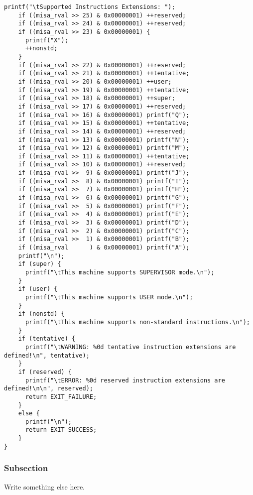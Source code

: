 \begin{lstlisting}[caption={A sample C++ code}, label=lst:sample_code]
    printf("\tSupported Instructions Extensions: ");
    if ((misa_rval >> 25) & 0x00000001) ++reserved;
    if ((misa_rval >> 24) & 0x00000001) ++reserved;
    if ((misa_rval >> 23) & 0x00000001) {
      printf("X");
      ++nonstd;
    }
    if ((misa_rval >> 22) & 0x00000001) ++reserved;
    if ((misa_rval >> 21) & 0x00000001) ++tentative;
    if ((misa_rval >> 20) & 0x00000001) ++user;
    if ((misa_rval >> 19) & 0x00000001) ++tentative;
    if ((misa_rval >> 18) & 0x00000001) ++super;
    if ((misa_rval >> 17) & 0x00000001) ++reserved;
    if ((misa_rval >> 16) & 0x00000001) printf("Q");
    if ((misa_rval >> 15) & 0x00000001) ++tentative;
    if ((misa_rval >> 14) & 0x00000001) ++reserved;
    if ((misa_rval >> 13) & 0x00000001) printf("N");
    if ((misa_rval >> 12) & 0x00000001) printf("M");
    if ((misa_rval >> 11) & 0x00000001) ++tentative;
    if ((misa_rval >> 10) & 0x00000001) ++reserved;
    if ((misa_rval >>  9) & 0x00000001) printf("J");
    if ((misa_rval >>  8) & 0x00000001) printf("I");
    if ((misa_rval >>  7) & 0x00000001) printf("H");
    if ((misa_rval >>  6) & 0x00000001) printf("G");
    if ((misa_rval >>  5) & 0x00000001) printf("F");
    if ((misa_rval >>  4) & 0x00000001) printf("E");
    if ((misa_rval >>  3) & 0x00000001) printf("D");
    if ((misa_rval >>  2) & 0x00000001) printf("C");
    if ((misa_rval >>  1) & 0x00000001) printf("B");
    if ((misa_rval      ) & 0x00000001) printf("A");
    printf("\n");
    if (super) {
      printf("\tThis machine supports SUPERVISOR mode.\n");
    }
    if (user) {
      printf("\tThis machine supports USER mode.\n");
    }
    if (nonstd) {
      printf("\tThis machine supports non-standard instructions.\n");
    }
    if (tentative) {
      printf("\tWARNING: %0d tentative instruction extensions are defined!\n", tentative);
    }
    if (reserved) {
      printf("\tERROR: %0d reserved instruction extensions are defined!\n\n", reserved);
      return EXIT_FAILURE;
    }
    else {
      printf("\n");
      return EXIT_SUCCESS;
    }
}

\end{lstlisting}

\subsubsection{Subsection}
Write something else here.